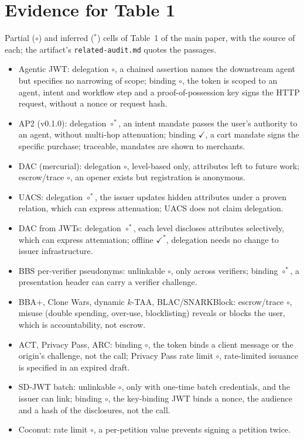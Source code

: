 \documentclass[10pt]{article}
\begin{document}
\section{Evidence for Table 1}\label{s:table1}\sloppy
Partial (\(\circ\)) and inferred (\(^*\)) cells of Table~1 of the main paper, with the source of each; the artifact's \texttt{related-audit.md} quotes the passages.
\begin{itemize}[leftmargin=*]
\item Agentic JWT: delegation \(\circ\), a chained assertion names the downstream agent but specifies no narrowing of scope; binding \(\circ\), the token is scoped to an agent, intent and workflow step and a proof-of-possession key signs the HTTP request, without a nonce or request hash.
\item AP2 (v0.1.0): delegation \(\circ^*\), an intent mandate passes the user's authority to an agent, without multi-hop attenuation; binding \(\checkmark\), a cart mandate signs the specific purchase; traceable, mandates are shown to merchants.
\item DAC (mercurial): delegation \(\circ\), level-based only, attributes left to future work; escrow/trace \(\circ\), an opener exists but registration is anonymous.
\item UACS: delegation \(\circ^*\), the issuer updates hidden attributes under a proven relation, which can express attenuation; UACS does not claim delegation.
\item DAC from JWTs: delegation \(\circ^*\), each level discloses attributes selectively, which can express attenuation; offline \(\checkmark^*\), delegation needs no change to issuer infrastructure.
\item BBS per-verifier pseudonyms: unlinkable \(\circ\), only across verifiers; binding \(\circ^*\), a presentation header can carry a verifier challenge.
\item BBA+, Clone Wars, dynamic \(k\)-TAA, BLAC/SNARKBlock: escrow/trace \(\circ\), misuse (double spending, over-use, blocklisting) reveals or blocks the user, which is accountability, not escrow.
\item ACT, Privacy Pass, ARC: binding \(\circ\), the token binds a client message or the origin's challenge, not the call; Privacy Pass rate limit \(\circ\), rate-limited issuance is specified in an expired draft.
\item SD-JWT batch: unlinkable \(\circ\), only with one-time batch credentials, and the issuer can link; binding \(\circ\), the key-binding JWT binds a nonce, the audience and a hash of the disclosures, not the call.
\item Coconut: rate limit \(\circ\), a per-petition value prevents signing a petition twice.
\end{itemize}



\end{document}
